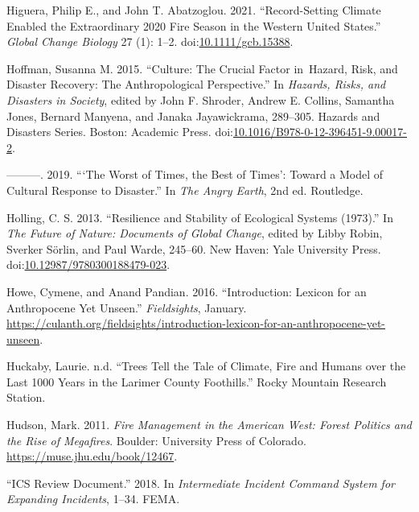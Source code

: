 \documentclass[
]{article}
\newlength{\cslhangindent}
\newenvironment{CSLReferences}[2] %
 {\begin{list}{}{%
  \setlength{\itemindent}{0pt}
  \setlength{\leftmargin}{0pt}
  \setlength{\parsep}{0pt}
  \ifodd #1
   \setlength{\leftmargin}{\cslhangindent}
   \setlength{\itemindent}{-1\cslhangindent}
  \fi
  \setlength{\itemsep}{#2\baselineskip}}}
 {\end{list}}
\begin{document}
\begin{CSLReferences}{1}{0}
Higuera, Philip E., and John T. Abatzoglou. 2021. {``Record-Setting Climate Enabled the Extraordinary 2020 Fire Season in the Western {United States}.''} \emph{Global Change Biology} 27 (1): 1--2. doi:\href{https://doi.org/10.1111/gcb.15388}{10.1111/gcb.15388}.

Hoffman, Susanna M. 2015. {``Culture: {The Crucial Factor} in~{Hazard}, {Risk}, and {Disaster Recovery}: {The Anthropological Perspective}.''} In \emph{Hazards, {Risks}, and {Disasters} in {Society}}, edited by John F. Shroder, Andrew E. Collins, Samantha Jones, Bernard Manyena, and Janaka Jayawickrama, 289--305. Hazards and {Disasters Series}. Boston: Academic Press. doi:\href{https://doi.org/10.1016/B978-0-12-396451-9.00017-2}{10.1016/B978-0-12-396451-9.00017-2}.

---------. 2019. {``{`{The Worst} of {Times}, the {Best} of {Times}'}: {Toward} a {Model} of {Cultural Response} to {Disaster}.''} In \emph{The {Angry Earth}}, 2nd ed. Routledge.

Holling, C. S. 2013. {``Resilience and {Stability} of {Ecological Systems} (1973).''} In \emph{The {Future} of {Nature}: {Documents} of {Global Change}}, edited by Libby Robin, Sverker Sörlin, and Paul Warde, 245--60. New Haven: Yale University Press. doi:\href{https://doi.org/10.12987/9780300188479-023}{10.12987/9780300188479-023}.

Howe, Cymene, and Anand Pandian. 2016. {``Introduction: {Lexicon} for an {Anthropocene Yet Unseen}.''} \emph{Fieldsights}, January. \url{https://culanth.org/fieldsights/introduction-lexicon-for-an-anthropocene-yet-unseen}.

Huckaby, Laurie. n.d. {``Trees Tell the Tale of Climate, Fire and Humans over the Last 1000 Years in the {Larimer County} Foothills.''} Rocky Mountain Research Station.

Hudson, Mark. 2011. \emph{Fire {Management} in the {American West}: {Forest Politics} and the {Rise} of {Megafires}}. Boulder: University Press of Colorado. \url{https://muse.jhu.edu/book/12467}.

{``{ICS Review Document}.''} 2018. In \emph{Intermediate {Incident Command System} for {Expanding Incidents}}, 1--34. FEMA.


\end{CSLReferences}
\end{document}
